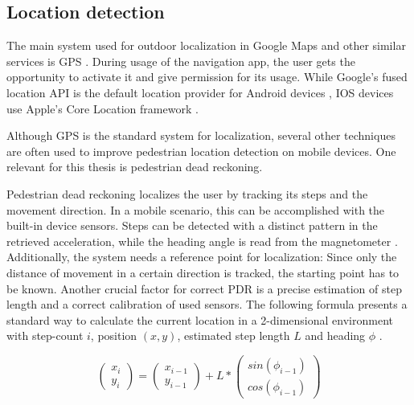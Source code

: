 

\subsection{Location detection}
The main system used for outdoor localization in Google Maps and other similar services is GPS \cite{google_maps}. During usage of the navigation app, the user gets the opportunity to activate it and give permission for its usage. While Google's fused location API is the default location provider for Android devices \cite{fused_location_api}, IOS devices use Apple's Core Location framework \cite{core_location_framework}.

Although GPS is the standard system for localization, several other techniques are often used to improve pedestrian location detection on mobile devices. One relevant for this thesis is pedestrian dead reckoning.

Pedestrian dead reckoning localizes the user by tracking its steps and the movement direction. In a mobile scenario, this can be accomplished with the built-in device sensors. Steps can be detected with a distinct pattern in the retrieved acceleration, while the heading angle is read from the magnetometer \cite{PDR}. Additionally, the system needs a reference point for localization: Since only the distance of movement in a certain direction is tracked, the starting point has to be known. Another crucial factor for correct PDR is a precise estimation of step length \cite{PDR} and a correct calibration of used sensors. The following formula presents a standard way to calculate the current location in a 2-dimensional environment with step-count $i$, position $(x, y)$, estimated step length $L$ and heading $\phi$ \cite{PDR_2}.

\begin{equation}
    \begin{pmatrix}x_{i}\\y_{i}\end{pmatrix} = \begin{pmatrix}x_{i-1}\\y_{i-1}\end{pmatrix} + L * \begin{pmatrix}sin(\phi_{i-1})\\cos(\phi_{i-1})\end{pmatrix}
\end{equation}

